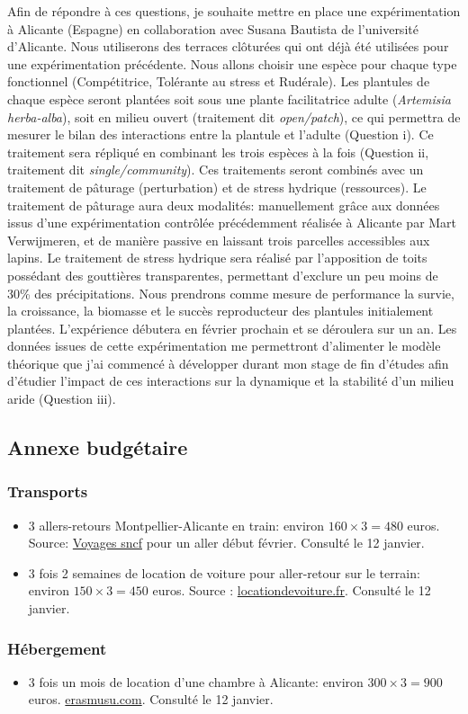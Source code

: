 \documentclass[12pt]{article} %
\begin{document}
Afin de répondre à ces questions, je souhaite mettre en place une expérimentation à Alicante (Espagne) en collaboration avec Susana Bautista de l'université d'Alicante. Nous utiliserons des terraces clôturées qui ont déjà été utilisées pour une expérimentation précédente. Nous allons choisir une espèce pour chaque type fonctionnel (Compétitrice, Tolérante au stress et Rudérale). Les plantules de chaque espèce seront plantées soit sous une plante facilitatrice adulte (\textit{Artemisia herba-alba}), soit en milieu ouvert (traitement dit \textit{open/patch}), ce qui permettra de mesurer le bilan des interactions entre la plantule et l'adulte (Question i). Ce traitement sera répliqué en combinant les trois espèces à la fois (Question ii, traitement dit \textit{single/community}). Ces traitements seront combinés avec un traitement de pâturage (perturbation) et de stress hydrique (ressources). Le traitement de pâturage aura deux modalités: manuellement grâce aux données issus d'une expérimentation contrôlée précédemment réalisée à Alicante par Mart Verwijmeren, et de manière passive en laissant trois parcelles accessibles aux lapins. Le traitement de stress hydrique sera réalisé par l'apposition de toits possédant des gouttières transparentes, permettant d'exclure un peu moins de 30\% des précipitations. Nous prendrons comme mesure de performance la survie, la croissance, la biomasse et le succès reproducteur des plantules initialement plantées. L'expérience débutera en février prochain et se déroulera sur un an.
Les données issues de cette expérimentation me permettront d'alimenter le modèle théorique que j'ai commencé à développer durant mon stage de fin d'études afin d'étudier l'impact de ces interactions sur la dynamique et la stabilité d'un milieu aride (Question iii).

\printbibliography

\subsection{Annexe budgétaire}

\subsubsection{Transports}

\begin{itemize}
\item 3 allers-retours Montpellier-Alicante en train: environ $160 \times 3 = 480$ euros. Source: \href{http://www.voyages-sncf.com}{Voyages sncf} pour un aller début février. Consulté le 12 janvier. 

\item 3 fois 2 semaines de location de voiture pour aller-retour sur le terrain: environ $150 \times 3 = 450$ euros. Source : \href{https://www.locationdevoiture.fr/}{locationdevoiture.fr}. Consulté le 12 janvier.
\end{itemize}

\subsubsection{Hébergement}

\begin{itemize}
\item 3 fois un mois de location d'une chambre à Alicante: environ $300 \times 3 = 900$ euros.
\href{http://erasmusu.com/fr/erasmus-alicante/logement-etudiant}{erasmusu.com}. Consulté le 12 janvier.
\end{itemize}
\end{document}
